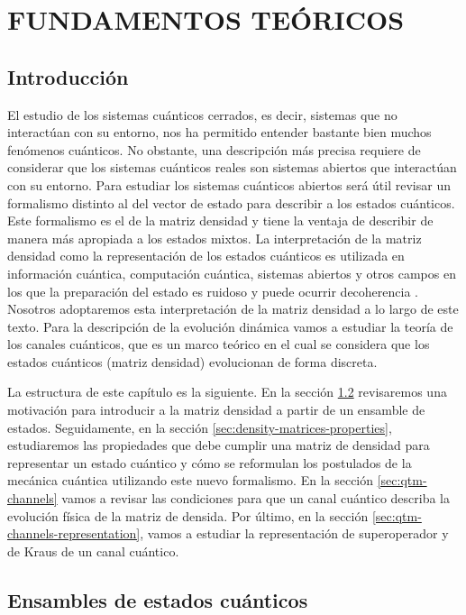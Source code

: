 \chapter{FUNDAMENTOS TEÓRICOS}
\section{Introducción} %
El estudio de los sistemas cuánticos cerrados, es decir, sistemas que no
interactúan con su entorno, nos ha permitido entender bastante bien muchos
fenómenos cuánticos. 
No obstante, una descripción más precisa 
requiere de considerar que los sistemas cuánticos reales son sistemas abiertos
que interactúan con su entorno. Para estudiar los 
sistemas cuánticos abiertos será útil revisar un formalismo distinto
al del vector de estado para describir a los estados cuánticos. 
Este formalismo es el de la matriz densidad y tiene la ventaja 
de describir de manera más apropiada a los estados mixtos. 
La interpretación de la matriz densidad como la representación de los 
estados cuánticos es utilizada en información cuántica, computación cuántica, 
sistemas abiertos y otros campos en los que la preparación del estado es 
ruidoso y puede ocurrir decoherencia \cite{fano1957description,nielsen_chuang_2011,wilde2013quantum}. Nosotros adoptaremos esta interpretación
de la matriz densidad a lo largo de este texto. 
Para la descripción de la evolución dinámica  
vamos a estudiar la teoría de los canales cuánticos, 
que es un marco teórico en el cual se considera que los estados 
cuánticos (matriz densidad) evolucionan de forma discreta.

La estructura de este capítulo es la siguiente.
En la sección \ref{sec:ensambles} revisaremos una motivación para introducir 
a la matriz densidad a partir de un ensamble de estados. 
Seguidamente, en la sección \ref{sec:density-matrices-properties},
estudiaremos las propiedades que debe cumplir una matriz 
de densidad para representar un estado cuántico
y cómo se reformulan los postulados 
de la mecánica cuántica utilizando este nuevo formalismo.
En la sección \ref{sec:qtm-channels} vamos a revisar las
condiciones para que un canal cuántico describa la evolución 
física de la matriz de densida. Por último, en la sección
\ref{sec:qtm-channels-representation}, vamos a estudiar 
la representación de superoperador y de Kraus de un canal cuántico.

\section{Ensambles de estados cuánticos} \label{sec:ensambles} %

